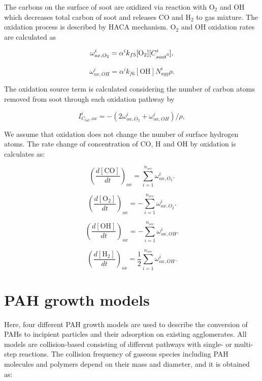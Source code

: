 The carbons on the surface of soot are oxidized via reaction with $\mathrm{O_2}$ and $\mathrm{OH}$ which decreases total carbon of soot and releases CO and $\mathrm{H_2}$ to gas mixture. The oxidation process is described by HACA mechanism. $\mathrm{O_2}$ and $\mathrm{OH}$ oxidation rates are calculated as

\begin{equation}
	\omega^i_{ox,O_2} = \alpha^i k_{f5} [\mathrm{O_2}][C^i_{soot\mbox{\textdegree}}]
	\label{eqn:hacaO2Rate},
\end{equation}

\begin{equation}
	\omega^i_{ox,OH} = \alpha^i k_{f6} [\mathrm{OH}]N^i_{agg} \rho
	\label{eqn:hacaOHRate}.
\end{equation}

The oxidation source term is calculated considering the number of carbon atoms removed from soot through each oxidation pathway by

\begin{equation}
	I^i_{C_{tot},ox} = -(2\omega^i_{ox,O_2} + \omega^i_{ox,OH})/\rho
	\label{eqn:ICtot},
\end{equation}

We assume that oxidation does not change the number of surface hydrogen atoms. The rate change of concentration of CO, H and OH by oxidation is calculates as:

\begin{equation}
	\left(\frac{d\left[{\mathrm{CO}}\right]}{dt}\right)_{ox} = \sum_{i=1}^{n_{sec}}\omega^i_{ox,O_2}
	\label{eqn:COrate_ox}.
\end{equation}

\begin{equation}
	\left(\frac{d\left[{\mathrm{O_2}}\right]}{dt}\right)_{ox} = -\sum_{i=1}^{n_{sec}}\omega^i_{ox,O_2}
	\label{eqn:COrate_ox}.
\end{equation}

\begin{equation}
	\left(\frac{d\left[{\mathrm{OH}}\right]}{dt}\right)_{ox} = -\sum_{i=1}^{n_{sec}}\omega^i_{ox,OH}
	\label{eqn:Hrate_ox}.
\end{equation}

\begin{equation}
	\left(\frac{d\left[{\mathrm{H_2}}\right]}{dt}\right)_{ox} = \frac{1}{2}\sum_{i=1}^{n_{sec}}\omega^i_{ox,OH}
	\label{eqn:OHrate_ox}.
\end{equation}

\section{PAH growth models}
\label{sec:pahgrowmodel}
Here, four different PAH growth models are used to describe the conversion of PAHs to incipient particles and their adsorption on existing agglomerates. All models are collision-based consisting of different pathways with single- or multi-step reactions. The collision frequency of gaseous species including PAH molecules and polymers depend on their mass and diameter, and it is obtained as:

